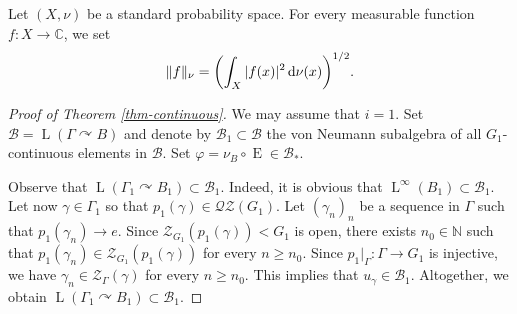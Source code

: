 \documentclass[JEP,XML,SOM,Unicode,published]{cedram}
\theoremstyle{definition}
\newcommand{\C}{\mathbb{C}}
\newcommand{\N}{\mathbb{N}}
\DeclareMathOperator{\rE}{ E}
\DeclareMathOperator{\rL}{L}
\begin{document}
Let $(X, \nu)$ be a standard probability space. For every measurable function \hbox{$f : X \to \C$}, we set
\[
\|f\|_{\nu} = \biggl( \int_X |f(x)|^2 \, {\rm d}\nu(x)\biggr)^{1/2}.
\]

\begin{proof}[Proof of Theorem \ref{thm-continuous}]
We may assume that $i = 1$. Set $\mathscr B = \rL(\Gamma \curvearrowright B)$ and denote by $\mathscr B_1 \subset \mathscr B$ the von Neumann subalgebra of all $G_1$-continuous elements in $\mathscr B$. Set $\varphi = \nu_B \circ \rE \in \mathscr B_\ast$.

Observe that $\rL(\Gamma_1 \curvearrowright B_1) \subset \mathscr B_1$. Indeed, it is obvious that $\rL^\infty(B_1) \subset \mathscr B_1$. Let now $\gamma \in \Gamma_1$ so that $p_1(\gamma) \in \mathscr{Q}\mathscr{Z}(G_1)$. Let $(\gamma_n)_n$ be a sequence in $\Gamma$ such that $p_1(\gamma_n) \to e$. Since $\mathscr Z_{G_1}(p_1(\gamma)) < G_1$ is open, there exists $n_0 \in \N$ such that $p_1(\gamma_n) \in \mathscr Z_{G_1}(p_1(\gamma))$ for every $n \geq n_0$. Since $p_1|_\Gamma : \Gamma \to G_1$ is injective, we have $\gamma_n \in \mathscr Z_\Gamma(\gamma)$ for every $n \geq n_0$. This implies that $u_\gamma \in \mathscr B_1$. Altogether, we obtain $\rL(\Gamma_1 \curvearrowright B_1) \subset \mathscr B_1$.


\end{proof}
\end{document}
